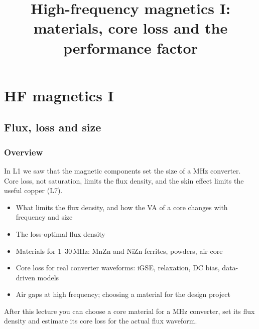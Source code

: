 \title[HF magnetics I]{High-frequency magnetics I: materials, core loss and the performance factor}
\section{HF magnetics I}

\begin{frame}[plain]
	\titlepage
\end{frame}

\subsection{Flux, loss and size}

\begin{frame}
	\frametitle{Overview}
	In L1 we saw that the magnetic components set the size of a MHz converter. Core loss, not saturation, limits the flux density, and the skin effect limits the useful copper (L7).
	\begin{itemize}
		\item What limits the flux density, and how the VA of a core changes with frequency and size
		\item The loss-optimal flux density
		\item Materials for 1--30\,MHz: MnZn and NiZn ferrites, powders, air core
		\item Core loss for real converter waveforms: iGSE, relaxation, DC bias, data-driven models
		\item Air gaps at high frequency; choosing a material for the design project
	\end{itemize}
	After this lecture you can choose a core material for a MHz converter, set its flux density and estimate its core loss for the actual flux waveform.
\end{frame}

